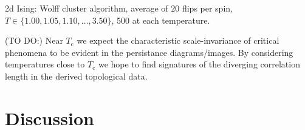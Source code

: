 \documentclass[11pt]{article}
\begin{document}
2d Ising: Wolff cluster algorithm, average of $20$ flips per spin, $T\in\{1.00,1.05,1.10,\ldots,3.50\}$, 500 at each temperature.


(TO DO:) Near $T_\text{c}$ we expect the characteristic scale-invariance of critical phenomena to be evident in the persistance diagrams/images. By considering temperatures close to $T_\text{c}$ we hope to find signatures of the diverging correlation length in the derived topological data.


\section{Discussion}
\end{document}
